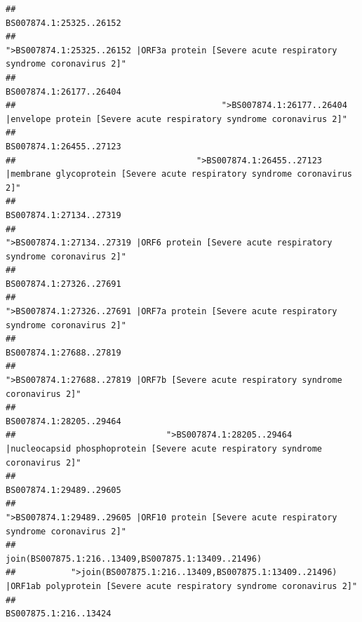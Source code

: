 \documentclass[
]{article}
\begin{document}
\begin{verbatim}
##                                                                                                                BS007874.1:25325..26152 
##                                            ">BS007874.1:25325..26152 |ORF3a protein [Severe acute respiratory syndrome coronavirus 2]" 
##                                                                                                                BS007874.1:26177..26404 
##                                         ">BS007874.1:26177..26404 |envelope protein [Severe acute respiratory syndrome coronavirus 2]" 
##                                                                                                                BS007874.1:26455..27123 
##                                    ">BS007874.1:26455..27123 |membrane glycoprotein [Severe acute respiratory syndrome coronavirus 2]" 
##                                                                                                                BS007874.1:27134..27319 
##                                             ">BS007874.1:27134..27319 |ORF6 protein [Severe acute respiratory syndrome coronavirus 2]" 
##                                                                                                                BS007874.1:27326..27691 
##                                            ">BS007874.1:27326..27691 |ORF7a protein [Severe acute respiratory syndrome coronavirus 2]" 
##                                                                                                                BS007874.1:27688..27819 
##                                                    ">BS007874.1:27688..27819 |ORF7b [Severe acute respiratory syndrome coronavirus 2]" 
##                                                                                                                BS007874.1:28205..29464 
##                              ">BS007874.1:28205..29464 |nucleocapsid phosphoprotein [Severe acute respiratory syndrome coronavirus 2]" 
##                                                                                                                BS007874.1:29489..29605 
##                                            ">BS007874.1:29489..29605 |ORF10 protein [Severe acute respiratory syndrome coronavirus 2]" 
##                                                                                    join(BS007875.1:216..13409,BS007875.1:13409..21496) 
##           ">join(BS007875.1:216..13409,BS007875.1:13409..21496) |ORF1ab polyprotein [Severe acute respiratory syndrome coronavirus 2]" 
##                                                                                                                  BS007875.1:216..13424 

\end{verbatim}
\end{document}
